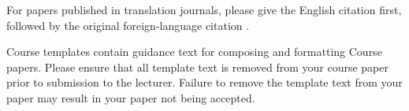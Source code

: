 \documentclass[conference]{IEEEtran}
\begin{document}
For papers published in translation journals, please give the English 
citation first, followed by the original foreign-language citation \cite{yorozu1987electron}.




\vspace{12pt}
\color{red}
Course templates contain guidance text for composing and formatting Course papers. Please ensure that all template text is removed from your course paper prior to submission to the lecturer. Failure to remove the template text from your paper may result in your paper not being accepted.
\end{document}
